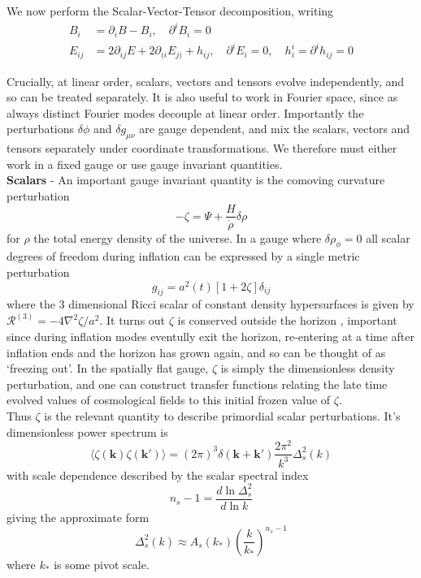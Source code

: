 \documentclass[a4paper,10pt]{article}
\renewcommand{\v}[1]{\mathbf{#1}}
\begin{document}
We now perform the Scalar-Vector-Tensor decomposition, writing
\begin{align}
B_i &= \partial_i B - B_i, \quad \partial^iB_i=0\\
E_{ij} &= 2\partial_{ij}E + 2\partial_{(i}E_{j)} + h_{ij}, \quad \partial^iE_i=0, \quad h^i_i = \partial^ih_{ij}=0
\end{align}

Crucially, at linear order, scalars, vectors and tensors evolve independently, and so can be treated separately. It is also useful to work in Fourier space, since as always distinct Fourier modes decouple at linear order. Importantly the perturbations $\delta\phi$ and $\delta g_{\mu\nu}$ are gauge dependent, and mix the scalars, vectors and tensors separately under coordinate transformations. We therefore must either work in a fixed gauge or use gauge invariant quantities.\\

\textbf{Scalars} - An important gauge invariant quantity is the comoving curvature perturbation
\begin{equation}
-\zeta = \Psi + \frac{H}{\dot\rho}\delta{\rho} 
\label{zeta}
\end{equation}
for $\rho$ the total energy density of the universe. In a gauge where $\delta{\rho}_\phi = 0$ all scalar degrees of freedom during inflation can be expressed by a single metric perturbation 
\begin{equation}
g_{ij} = a^2(t)[1+2\zeta]\delta_{ij}
\end{equation}
where the 3 dimensional Ricci scalar of constant density hypersurfaces is given by $\mathcal{R}^{(3)} = -4\nabla^2\zeta / a^2$. It turns out $\zeta$ is conserved outside the horizon \cite{baumann}, important since during inflation modes eventully exit the horizon, re-entering at a time after inflation ends and the horizon has grown again, and so can be thought of as `freezing out'. In the spatially flat gauge, $\zeta$ is simply the dimensionless density perturbation, and one can construct transfer functions relating the late time evolved values of cosmological fields to this initial frozen value of $\zeta$. \\

Thus $\zeta$ is the relevant quantity to describe primordial scalar perturbations. It's dimensionless power spectrum is
\begin{equation}
\langle \zeta(\v{k})\zeta(\v{k'}) \rangle=(2\pi)^3\delta(\v{k}+\v{k'})\frac{2\pi^2}{k^3}\Delta^2_s(k)
\end{equation}
with scale dependence described by the scalar spectral index
\begin{equation}
n_s-1 = \frac{d\ln{\Delta^2_s}}{d\ln{k}}
\end{equation}
giving the approximate form 
\begin{equation}
\Delta^2_s(k) \approx A_s(k_*)(\frac{k}{k_*})^{n_s-1} 
\end{equation}
where $k_*$ is some pivot scale. \\
\end{document}
